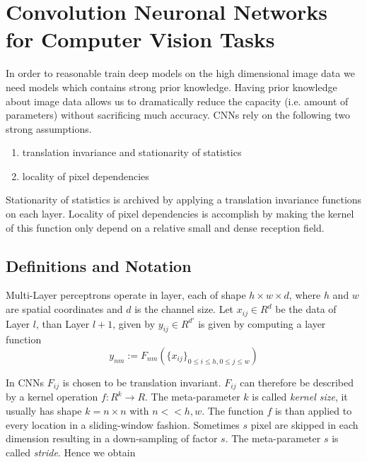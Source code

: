 

\section{Convolution Neuronal Networks for Computer Vision Tasks}

In order to reasonable train deep models on the high dimensional image data we need models which contains strong prior knowledge. Having prior knowledge about image data allows us to dramatically reduce the capacity (i.e. amount of parameters) without sacrificing much accuracy. CNNs rely on the following two strong assumptions.

\begin{enumerate}
    \item translation invariance and stationarity of statistics
	\item locality of pixel dependencies
\end{enumerate}

Stationarity of statistics is archived by applying a translation invariance functions on each layer. Locality of pixel dependencies is accomplish by making the kernel of this function only depend on a relative small and dense reception field. 

\subsection{Definitions and Notation}

Multi-Layer perceptrons operate in layer, each of shape $h \times w \times d$, where $h$ and $w$ are spatial coordinates and $d$ is the channel size. Let $x_{ij} \in R^d$ be the data of Layer $l$, than Layer $l+1$, given by $y_{ij} \in R^{d'}$ is given by computing a layer function 
\begin{equation*}
y_{nm} := F_{nm} (\{ x_{ij} \}_{0 \leq i \leq h, 0 \leq j \leq w}   )
\end{equation*}

In CNNs $F_{ij}$ is chosen to be translation invariant. $F_{ij}$ can therefore be described by a kernel  operation $f: R^k \rightarrow R$. The meta-parameter $k$ is called \emph{kernel size}, it usually has shape $k = n \times n$ with $n << h,w$.  The function $f$ is than applied to every location in a sliding-window fashion. Sometimes $s$ pixel are skipped in each dimension resulting in a down-sampling of factor $s$. The meta-parameter $s$ is called \emph{stride}. Hence we obtain

